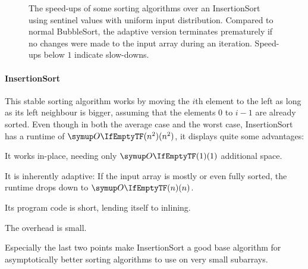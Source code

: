 \begin{figure}
	\caption{
		The speed-ups of some sorting algorithms over an InsertionSort using sentinel values with uniform input distribution.
		Compared to normal BubbleSort, the adaptive version terminates prematurely if no changes were made to the input array during an iteration.
		Speed-ups below \(1\) indicate slow-downs.
	}
	\label{fig:speed-up_over_is}
\end{figure}

\paragraph{InsertionSort}
This stable sorting algorithm works by moving the \(i\)th element to the left as long as its left neighbour is bigger, assuming that the elements \(0\) to \(i - 1\) are already sorted.
Even though in both the average case and the worst case, InsertionSort has a runtime of \(\bigomicron{n^2}\), it displays quite some advantages:
\begin{enumerate*}
	\item
	It works in-place, needing only \(\bigomicron{1}\) additional space.

	\item
	It is inherently adaptive:
	If the input array is mostly or even fully sorted, the runtime drops down to \(\bigomicron{n}\).

	\item
	Its program code is short, lending itself to inlining.

	\item
	The overhead is small.
\end{enumerate*}
Especially the last two points make InsertionSort a good base algorithm for asymptotically better sorting algorithms to use on very small subarrays.

